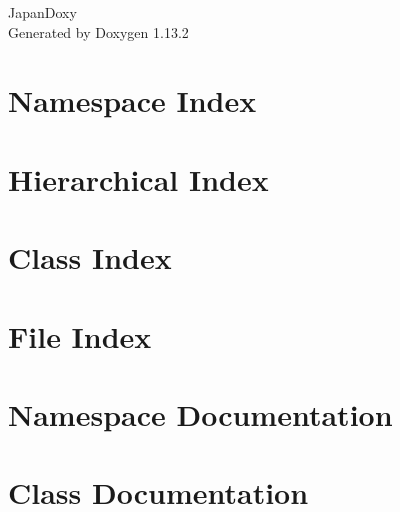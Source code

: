 \documentclass[twoside]{book}
\newcommand{\+}{\discretionary{\mbox{\scriptsize$\hookleftarrow$}}{}{}}
\newcommand{\clearemptydoublepage}{%
    \newpage{\pagestyle{empty}\cleardoublepage}%
  }
\begin{document}
  \raggedbottom
    \hypersetup{pageanchor=false,
                bookmarksnumbered=true,
                pdfencoding=unicode
               }
  \begin{titlepage}
  \vspace*{7cm}
  \begin{center}%
  {\Large Japan\+Doxy}\\
  \vspace*{1cm}
  {\large Generated by Doxygen 1.13.2}\\
  \end{center}
  \end{titlepage}
  \clearemptydoublepage
  \tableofcontents
  \clearemptydoublepage
  \hypersetup{pageanchor=true}
\chapter{Namespace Index}

\chapter{Hierarchical Index}

\chapter{Class Index}

\chapter{File Index}

\chapter{Namespace Documentation}

\chapter{Class Documentation}




































\end{document}
